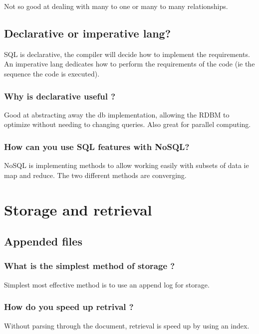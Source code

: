 \documentclass[11pt]{scrartcl} %
\begin{document}
Not so good at dealing with many to one or many to many relationships.

\subsection{Declarative or imperative lang?}

SQL is declarative, the compiler will decide how to implement the requirements. An imperative lang dedicates how to perform
the requirements of the code (ie the sequence the code is executed).

\subsubsection{Why is declarative useful ?}

Good at abstracting away the db implementation, allowing the RDBM to optimize without needing to changing queries. Also
great for parallel computing.

\subsubsection{How can you use SQL features with NoSQL?}

NoSQL is implementing methods to allow working easily with subsets of data ie map and reduce. The two different methods
are converging.

\section{Storage and retrieval}

\subsection{Appended files}

\subsubsection{What is the simplest method of storage ?}

Simplest most effective method is to use an append log for storage.

\subsubsection{How do you speed up retrival ?}

Without parsing through the document, retrieval is speed up by using an index.\\
\end{document}
